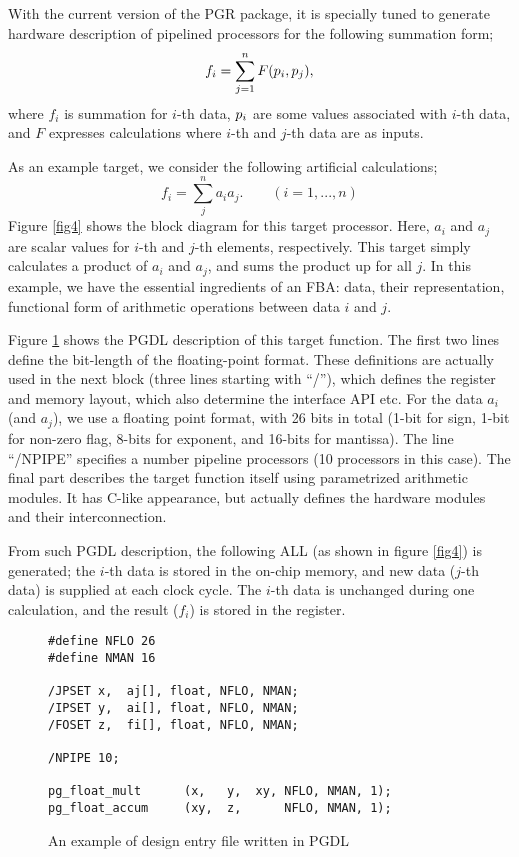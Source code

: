 \documentclass[times, 10pt,twocolumn]{article}
\begin{document}
With the current version of the PGR package, it is specially tuned
to generate hardware description of pipelined processors
for the following summation form;
\begin{equation}
f_i = \sum_{j = 1}^{n} F(\boldmath{p}_i, \boldmath{p}_j),
\end{equation}
where $f_i$ is summation for $i$-th data, $\boldmath{p}_i$ are
some values associated with $i$-th data, and
$F$ expresses calculations where $i$-th and $j$-th data are as inputs.

As an example target, we consider the following artificial calculations;
\begin{equation}
f_i = \sum_j^n {a_i a_j}.\qquad (i=1,...,n)
\end{equation}
Figure \ref{fig4} shows the block diagram
for this target processor.
Here, $a_i$ and $a_j$ are scalar values for $i$-th and
$j$-th elements, respectively.
This target simply calculates a product of $a_i$ and $a_j$, 
and sums the product up for all $j$.
In this example, we have the essential ingredients of an FBA:
data, their representation, functional form of arithmetic operations
between data $i$ and $j$.

Figure \ref{fig5} shows the PGDL description of this target function.
The first two lines define the bit-length of the floating-point format.
These definitions are actually used in the next block
(three lines starting with ``/''),
which defines the register and memory layout,
which also determine the interface API etc. 
For the data $a_i$ (and $a_j$), we use a floating point format,
with 26 bits in total (1-bit for sign, 1-bit for non-zero flag, 8-bits
for exponent, and 16-bits for mantissa).
The line ``/NPIPE'' specifies a number pipeline processors (10 processors in this case).
The final part describes the target function itself using
parametrized arithmetic modules. It has C-like appearance, but
actually defines the hardware modules and their interconnection.

From such PGDL description, the following ALL (as shown in figure \ref{fig4})
is generated; the $i$-th data is stored in the on-chip memory,
and new data ($j$-th data) is supplied at each clock cycle.
The $i$-th data is unchanged during one calculation, and 
the result ($f_i$) is stored in the register.

\begin{figure}
\scriptsize
\begin{verbatim}
#define NFLO 26
#define NMAN 16

/JPSET x,  aj[], float, NFLO, NMAN;
/IPSET y,  ai[], float, NFLO, NMAN;
/FOSET z,  fi[], float, NFLO, NMAN;

/NPIPE 10;

pg_float_mult      (x,   y,  xy, NFLO, NMAN, 1);
pg_float_accum     (xy,  z,      NFLO, NMAN, 1);
\end{verbatim}
\caption{An example of design entry file written in PGDL}
\label{fig5}
\end{figure}
\end{document}

